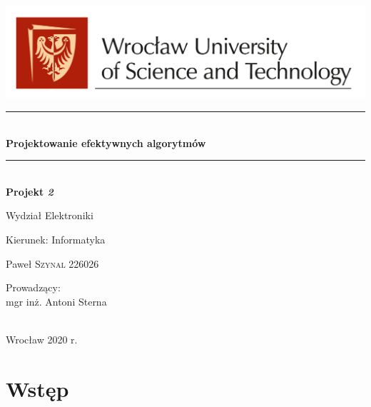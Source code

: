 \documentclass{article}
\begin{document}
\begin{titlepage}
    \newcommand{\HRule}{\rule{\linewidth}{0.5mm}}
    \center
    \includegraphics[scale=0.4]{logo.jpg}\\[1cm] 
    \HRule \\[0.8cm]
    { \Large \bfseries 	 Projektowanie efektywnych algorytmów }\\[0.4cm]
    \HRule \\[1.5cm]
    { \Large \bfseries Projekt \textit{2}}\\[0.4cm]
    \textbf{ }
    \vspace{10mm} 
    
    \begin{minipage}{0.4\textwidth}
    \begin{flushleft} \large
    \end{flushleft}
    \end{minipage}
    \begin{minipage}{0.5\textwidth}
    \begin{flushright} \large
    \vfill
    \vspace{10mm} %
    \par Wydział Elektroniki
    \par Kierunek: Informatyka
    \vfill
    \par Paweł \textsc{Szynal 226026} \\
    \vspace{10mm} %
   \vspace{10mm} %
   \par Prowadzący:\\ mgr inż. Antoni Sterna
    \end{flushright}
    \end{minipage}\\[3cm]
     {\large Wrocław 2020 r.}\\[2cm]
\end{titlepage}
   
\newpage
    
\tableofcontents
\newpage

\section{Wstęp}
\end{document}
